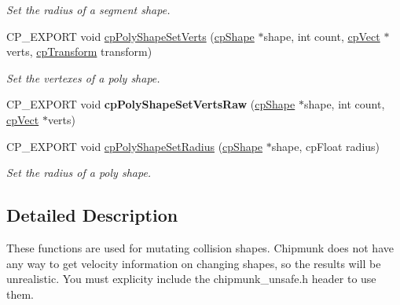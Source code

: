 \begin{DoxyCompactItemize}
\begin{DoxyCompactList}\small\item\em Set the radius of a segment shape. \end{DoxyCompactList}\item 
\mbox{\label{group__unsafe_gad5046c7627cb0ad37751c6ad5d4ad8b7}} 
C\+P\+\_\+\+E\+X\+P\+O\+RT void \hyperlink{group__unsafe_gad5046c7627cb0ad37751c6ad5d4ad8b7}{cp\+Poly\+Shape\+Set\+Verts} (\hyperlink{structcpShape}{cp\+Shape} $\ast$shape, int count, \hyperlink{structcpVect}{cp\+Vect} $\ast$verts, \hyperlink{structcpTransform}{cp\+Transform} transform)
\begin{DoxyCompactList}\small\item\em Set the vertexes of a poly shape. \end{DoxyCompactList}\item 
\mbox{\label{group__unsafe_ga6911a79495d7d7233cb2fa6d0b3f1eeb}} 
C\+P\+\_\+\+E\+X\+P\+O\+RT void {\bfseries cp\+Poly\+Shape\+Set\+Verts\+Raw} (\hyperlink{structcpShape}{cp\+Shape} $\ast$shape, int count, \hyperlink{structcpVect}{cp\+Vect} $\ast$verts)
\item 
\mbox{\label{group__unsafe_ga8a7d3c9e6117f0c7162c47ca73ae7226}} 
C\+P\+\_\+\+E\+X\+P\+O\+RT void \hyperlink{group__unsafe_ga8a7d3c9e6117f0c7162c47ca73ae7226}{cp\+Poly\+Shape\+Set\+Radius} (\hyperlink{structcpShape}{cp\+Shape} $\ast$shape, cp\+Float radius)
\begin{DoxyCompactList}\small\item\em Set the radius of a poly shape. \end{DoxyCompactList}\end{DoxyCompactItemize}


\subsection{Detailed Description}
These functions are used for mutating collision shapes. Chipmunk does not have any way to get velocity information on changing shapes, so the results will be unrealistic. You must explicity include the chipmunk\+\_\+unsafe.\+h header to use them. 